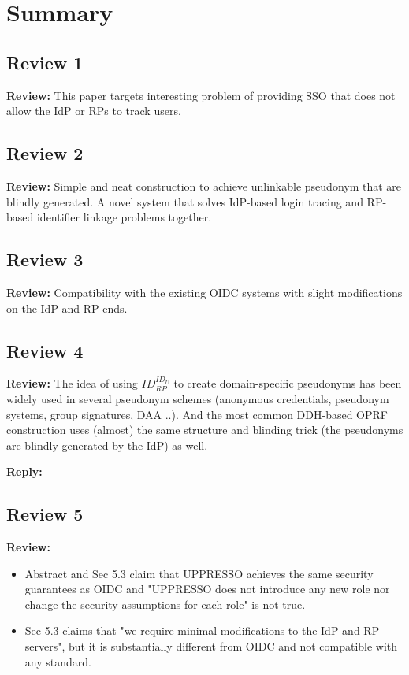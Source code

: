 \documentclass[letterpaper,onecolumn,10pt]{article}
\begin{document}
\section*{Summary}


\subsection*{Review 1}
\vspace{1mm}\noindent\textbf{Review:}
This paper targets interesting problem of providing SSO that does not allow the IdP or RPs to track users.


\subsection*{Review 2}
\vspace{1mm}\noindent\textbf{Review:}
Simple and neat construction to achieve unlinkable pseudonym that are blindly generated.
A novel system that solves IdP-based login tracing and RP-based identifier linkage problems together.

\subsection*{Review 3}
\vspace{1mm}\noindent\textbf{Review:}
Compatibility with the existing OIDC systems with slight modifications on the IdP and RP ends.

\subsection*{Review 4}
\vspace{1mm}\noindent\textbf{Review:}
The idea of using $ID_{RP}^{ID_U}$ to create domain-specific pseudonyms has been widely used in several pseudonym schemes (anonymous credentials, pseudonym systems, group signatures, DAA ..). And the most common DDH-based OPRF construction uses (almost) the same structure and blinding trick (the pseudonyms are blindly generated by the IdP) as well.

\vspace{1mm}\noindent\textbf{Reply:}

\subsection*{Review 5}
\vspace{1mm}\noindent\textbf{Review:}
\begin{itemize}
\item Abstract and Sec 5.3 claim that UPPRESSO achieves the same security guarantees as OIDC and "UPPRESSO does not introduce any new role nor change the security assumptions for each role" is not true.
 \item Sec 5.3 claims that "we require minimal modifications to the IdP and RP servers", but it is substantially different from OIDC and not compatible with any standard.

\end{itemize}
\end{document}
